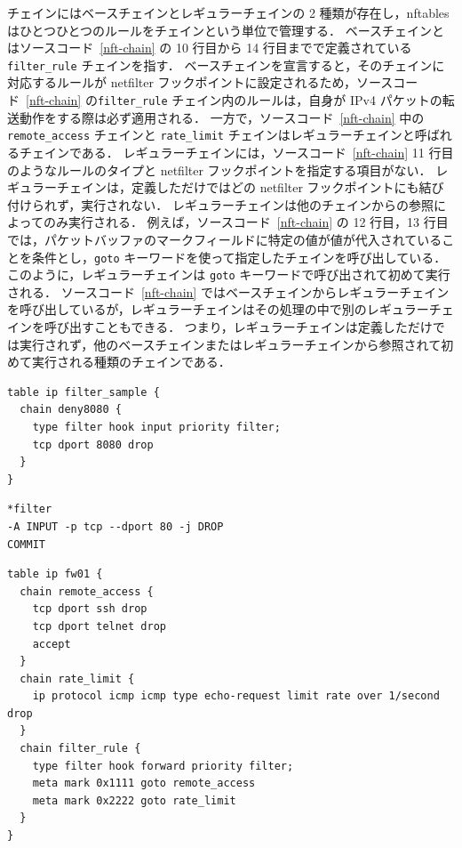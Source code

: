 チェインにはベースチェインとレギュラーチェインの 2 種類が存在し，nftables はひとつひとつのルールをチェインという単位で管理する．
ベースチェインとはソースコード~\ref*{nft-chain} の 10 行目から 14 行目までで定義されている \texttt{filter\_rule} チェインを指す．
ベースチェインを宣言すると，そのチェインに対応するルールが netfilter フックポイントに設定されるため，ソースコード~\ref*{nft-chain} の\texttt{filter\_rule} チェイン内のルールは，自身が IPv4 パケットの転送動作をする際は必ず適用される．
一方で，ソースコード~\ref*{nft-chain} 中の \texttt{remote\_access} チェインと \texttt{rate\_limit} チェインはレギュラーチェインと呼ばれるチェインである．
レギュラーチェインには，ソースコード~\ref*{nft-chain} 11 行目のようなルールのタイプと netfilter フックポイントを指定する項目がない．
レギュラーチェインは，定義しただけではどの netfilter フックポイントにも結び付けられず，実行されない．
レギュラーチェインは他のチェインからの参照によってのみ実行される．
例えば，ソースコード~\ref*{nft-chain} の 12 行目，13 行目では，パケットバッファのマークフィールドに特定の値が値が代入されていることを条件とし，\texttt{goto} キーワードを使って指定したチェインを呼び出している．
このように，レギュラーチェインは \texttt{goto} キーワードで呼び出されて初めて実行される．
ソースコード~\ref*{nft-chain} ではベースチェインからレギュラーチェインを呼び出しているが，レギュラーチェインはその処理の中で別のレギュラーチェインを呼び出すこともできる．
つまり，レギュラーチェインは定義しただけでは実行されず，他のベースチェインまたはレギュラーチェインから参照されて初めて実行される種類のチェインである．

\begin{lstlisting}[caption=nftables におけるシンプルなフィルタルールの定義例,label=nft-filter-rule]
table ip filter_sample {
  chain deny8080 {
    type filter hook input priority filter;
    tcp dport 8080 drop
  }
}
\end{lstlisting}

\begin{lstlisting}[caption=iptables におけるシンプルなフィルタルールの定義例,label=ipt-filter-rule]
*filter
-A INPUT -p tcp --dport 80 -j DROP
COMMIT
\end{lstlisting}

\begin{lstlisting}[caption=nftables におけるレギュラーチェインとベースチェインを利用したルールの定義例,label=nft-chain]
table ip fw01 {
  chain remote_access {
    tcp dport ssh drop
    tcp dport telnet drop
    accept
  }
  chain rate_limit {
    ip protocol icmp icmp type echo-request limit rate over 1/second drop
  }
  chain filter_rule {
    type filter hook forward priority filter;
    meta mark 0x1111 goto remote_access
    meta mark 0x2222 goto rate_limit
  }
}
\end{lstlisting}

